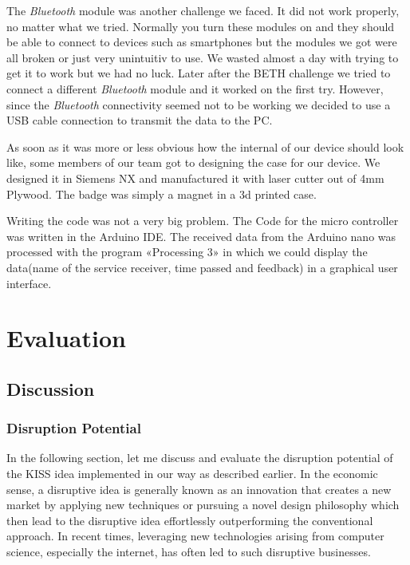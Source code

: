 \documentclass[12pt]{report}
\begin{document}
The \emph{Bluetooth} module was another challenge we faced. It did not work properly, no matter what we tried. Normally you turn these modules on and they should be able to connect to devices such as smartphones but the modules we got were all broken or just very unintuitiv to use. We wasted almost a day with trying to get it to work but we had no luck. Later after the BETH challenge we tried to connect a different \emph{Bluetooth} module and it worked on the first try. However, since the \emph{Bluetooth} connectivity seemed not to be working we decided to use a USB cable connection to transmit the data to the PC.

As soon as it was more or less obvious how the internal of our device should look like, some members of our team got to designing the case for our device. We designed it in Siemens NX and manufactured it with laser cutter out of 4mm Plywood. The badge was simply a magnet in a 3d printed case.

Writing the code was not a very big problem. The Code for the micro controller was written in the Arduino IDE. The received data from the Arduino nano was processed with the program «Processing 3» in which we could display the data(name of the service receiver, time passed and feedback) in a graphical user interface.



\chapter{Evaluation}

\section{Discussion}


\subsection{Disruption Potential}

In the following section, let me discuss and evaluate the disruption potential of the KISS idea implemented in our way as described earlier. In the economic sense, a disruptive idea is generally known as an innovation that creates a new market by applying new techniques or pursuing a novel design philosophy which then lead to the disruptive idea effortlessly outperforming the conventional approach. In recent times, leveraging new technologies arising from computer science, especially the internet, has often led to such disruptive businesses.
\end{document}
